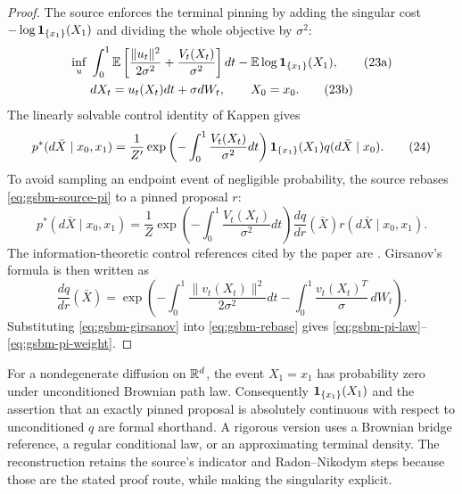 \begin{proof}
The source enforces the terminal pinning by adding the singular cost
$-\log\mathbf{1}_{\{x_1\}}(X_1)$ and dividing the whole objective by $\sigma^2$:
\begin{align}
  \inf_u\;&\int_0^1\mathbb{E}\left[
    \frac{\|u_t\|^2}{2\sigma^2}
    +\frac{V_t(X_t)}{\sigma^2}
  \right]dt
  -\mathbb{E}\log\mathbf{1}_{\{x_1\}}(X_1),
  \tag{23a}\label{eq:gsbm-singular-cost}\\
  &dX_t=u_t(X_t)dt+\sigma dW_t,
  \qquad X_0=x_0.
  \tag{23b}
\end{align}
The linearly solvable control identity of Kappen \cite{Kappen2005} gives
\begin{equation}
  p^*(d\bar X\mid x_0,x_1)
  =\frac1{Z'}
  \exp\left(-\int_0^1\frac{V_t(X_t)}{\sigma^2}dt\right)
  \mathbf{1}_{\{x_1\}}(X_1)
  q(d\bar X\mid x_0).
  \tag{24}\label{eq:gsbm-source-pi}
\end{equation}
To avoid sampling an endpoint event of negligible probability, the source
rebases \eqref{eq:gsbm-source-pi} to a pinned proposal $r$:
\begin{equation}
  p^*(d\bar X\mid x_0,x_1)
  =\frac1Z
  \exp\left(-\int_0^1\frac{V_t(X_t)}{\sigma^2}dt\right)
  \frac{dq}{dr}(\bar X)
  r(d\bar X\mid x_0,x_1).
  \tag{25}\label{eq:gsbm-rebase}
\end{equation}
The information-theoretic control references cited by the paper are
\cite{TheodorouBuchliSchaal2010,Theodorou2015}.  Girsanov's formula is then
written as
\begin{equation}
  \frac{dq}{dr}(\bar X)
  =\exp\left(
    -\int_0^1\frac{\|v_t(X_t)\|^2}{2\sigma^2}dt
    -\int_0^1\frac{v_t(X_t)^T}{\sigma}\,dW_t
  \right).
  \tag{26}\label{eq:gsbm-girsanov}
\end{equation}
Substituting \eqref{eq:gsbm-girsanov} into \eqref{eq:gsbm-rebase} gives
\eqref{eq:gsbm-pi-law}--\eqref{eq:gsbm-pi-weight}.
\end{proof}

\begin{remark}
For a nondegenerate diffusion on $\mathbb{R}^d$, the event $X_1=x_1$ has probability
zero under unconditioned Brownian path law.  Consequently
$\mathbf{1}_{\{x_1\}}(X_1)$ and the assertion that an exactly pinned proposal is
absolutely continuous with respect to unconditioned $q$ are formal shorthand.
A rigorous version uses a Brownian bridge reference, a regular conditional law,
or an approximating terminal density.  The reconstruction retains the source's
indicator and Radon--Nikodym steps because those are the stated proof route,
while making the singularity explicit.
\end{remark}

